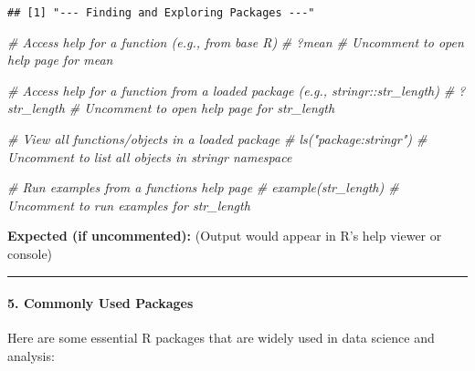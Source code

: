 \documentclass[
]{article}
\newenvironment{Shaded}{\begin{snugshade}}{\end{snugshade}}
\newcommand{\CommentTok}[1]{\textcolor[rgb]{0.56,0.35,0.01}{\textit{#1}}}
\begin{document}
\begin{verbatim}
## [1] "--- Finding and Exploring Packages ---"
\end{verbatim}

\begin{Shaded}
\begin{Highlighting}[]
\CommentTok{\# Access help for a function (e.g., from base R)}
\CommentTok{\# ?mean \# Uncomment to open help page for \textquotesingle{}mean\textquotesingle{}}

\CommentTok{\# Access help for a function from a loaded package (e.g., stringr::str\_length)}
\CommentTok{\# ?str\_length \# Uncomment to open help page for \textquotesingle{}str\_length\textquotesingle{}}

\CommentTok{\# View all functions/objects in a loaded package}
\CommentTok{\# ls("package:stringr") \# Uncomment to list all objects in stringr namespace}

\CommentTok{\# Run examples from a function\textquotesingle{}s help page}
\CommentTok{\# example(str\_length) \# Uncomment to run examples for str\_length}
\end{Highlighting}
\end{Shaded}

\textbf{Expected (if uncommented):} (Output would appear in R's help
viewer or console)

\begin{center}\rule{0.5\linewidth}{0.5pt}\end{center}

\paragraph{\texorpdfstring{\textbf{5. Commonly Used
Packages}}{5. Commonly Used Packages}}\label{commonly-used-packages}

Here are some essential R packages that are widely used in data science
and analysis:
\end{document}
